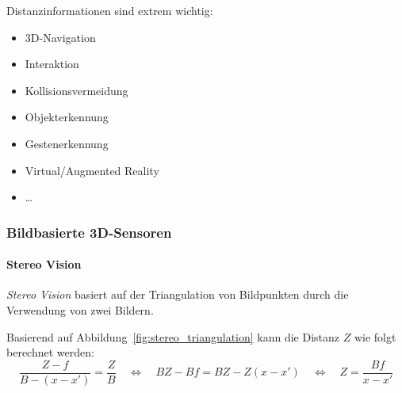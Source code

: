 \documentclass[a4paper, 11pt, accentcolor = tud3b]{tudreport}
\begin{document}
				Distanzinformationen sind extrem wichtig:
				\begin{itemize}
					\item 3D-Navigation
					\item Interaktion
					\item Kollisionsvermeidung
					\item Objekterkennung
					\item Gestenerkennung
					\item Virtual/Augmented Reality
					\item \dots
				\end{itemize}

				\subsubsection{Bildbasierte 3D-Sensoren}
					\paragraph{Stereo Vision}
						\emph{Stereo Vision} basiert auf der Triangulation von Bildpunkten durch die Verwendung von zwei Bildern.
						
						Basierend auf Abbildung~\ref{fig:stereo_triangulation} kann die Distanz \(Z\) wie folgt berechnet werden:
						\begin{equation*}
							\frac{Z - f}{B - (x - x')} = \frac{Z}{B} \quad\iff\quad BZ - Bf = BZ - Z(x - x') \quad\iff\quad Z = \frac{Bf}{x - x'}
						\end{equation*}
						
\end{document}
